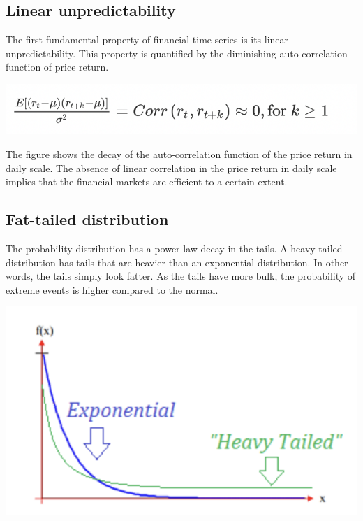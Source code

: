 \documentclass{article}
\begin{document}
\begin{multicols}{2}
    \subsection*{Linear unpredictability}
    The first fundamental property of financial time-series is its linear unpredictability. This property is quantified by the diminishing auto-correlation function of price return. \\
     \begin{center}
        \includegraphics[scale = 0.6]{imgs/elisa/lp.jpg} 
    \end{center}
    The figure shows the decay of the auto-correlation function of the price return in daily scale. The absence of linear correlation in the price return in daily scale implies that the financial markets are efficient to a certain extent.\\
    \subsection*{Fat-tailed distribution}
    The probability distribution has a power-law decay in the tails. A heavy tailed distribution has tails that are heavier than an exponential distribution.  In other words, the tails simply look fatter. As the tails have more bulk, the probability of extreme events is higher compared to the normal. 
    \begin{center}
        \includegraphics[scale = 0.6]{imgs/elisa/dist.jpg} 
    \end{center}
    


\end{multicols}
\end{document}
